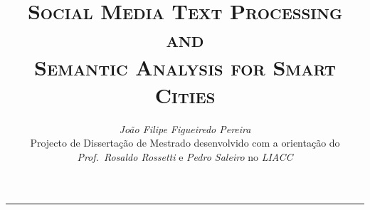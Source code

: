 \documentclass[9pt,a4paper]{extarticle}
\begin{document}
\title{\vspace*{-8mm}\textbf{\textsc{Social Media Text Processing and\\ Semantic Analysis for Smart Cities}}}
\author{\emph{João Filipe Figueiredo Pereira}\\[2mm]
\small{Projecto de Dissertação de Mestrado desenvolvido com a orientação do \emph{Prof.\ Rosaldo Rossetti} e \emph{Pedro Saleiro} no \emph{LIACC}}}
\date{}
\maketitle
\thispagestyle{empty}

\vspace*{-4mm}\noindent\rule{\textwidth}{0.4pt}\vspace*{4mm}
\end{document}
